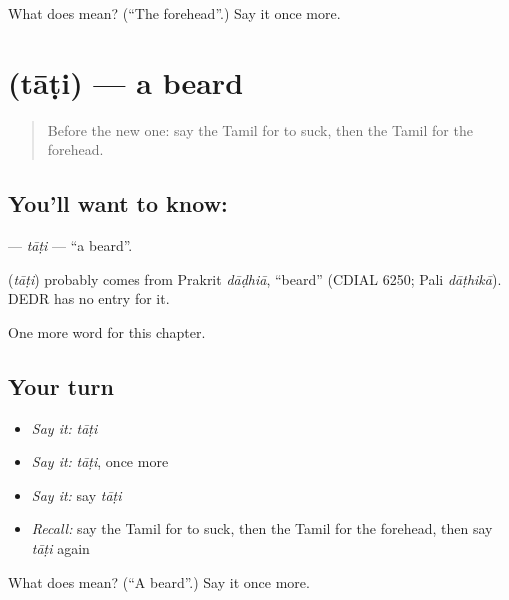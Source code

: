 \begin{tcolorbox}[breakable,colback=teal!4,colframe=teal!35!black,title={Before you move on}]
What does  mean? (\textquotedblleft{}The forehead\textquotedblright{}.) Say it once more.
\end{tcolorbox}
\section[\texorpdfstring{\ta{தாடி} (tāṭi)}{தாடி (tāṭi)}]{ (tāṭi) — a beard}

\label{lesson:TA-C201-tati}



\begin{quote}
Before the new one: say the Tamil for to suck, then the Tamil for the forehead.
\end{quote}

\subsection*{You'll want to know: }
\textbf{} — \emph{tāṭi} — \textquotedblleft{}a beard\textquotedblright{}.

\begin{cousinweb}
\textbf{} (\emph{tāṭi}) probably comes from Prakrit \emph{dāḍhiā}, \textquotedblleft{}beard\textquotedblright{} (CDIAL 6250; Pali \emph{dāṭhikā}). DEDR has no entry for it.
\end{cousinweb}

\begin{grammarlens}[title={What you've built}]
One more word for this chapter.
\end{grammarlens}

\subsection*{Your turn}
\begin{itemize}
\raggedright
  \item \emph{Say it:} \emph{tāṭi}
  \item \emph{Say it:} \emph{tāṭi}, once more
  \item \emph{Say it:} say \emph{tāṭi}
  \item \emph{Recall:} say the Tamil for to suck, then the Tamil for the forehead, then say \emph{tāṭi} again
\end{itemize}

\begin{tcolorbox}[breakable,colback=teal!4,colframe=teal!35!black,title={Before you move on}]
What does  mean? (\textquotedblleft{}A beard\textquotedblright{}.) Say it once more.
\end{tcolorbox}

